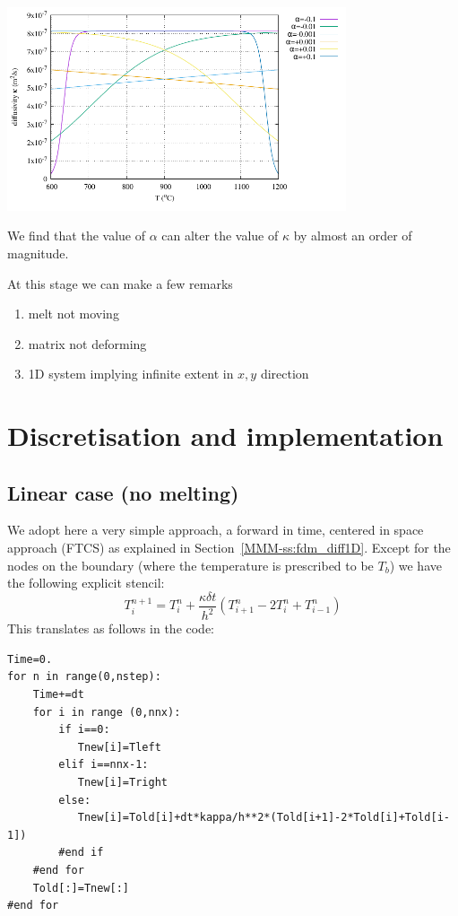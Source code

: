 \begin{center}
\includegraphics[width=10cm]{python_codes/fieldstone_169/images/kappa.pdf}
\end{center}
We find that the value of $\alpha$ can alter the value of $\kappa$ by almost an order of magnitude.

At this stage we can make a few remarks
\begin{enumerate}
\item melt not moving
\item matrix not deforming
\item 1D system implying infinite extent in $x,y$ direction
\end{enumerate}


\section*{Discretisation and implementation}

\subsection*{Linear case (no melting)}

We adopt here a very simple approach, a forward in time, 
centered in space approach (FTCS) as explained in Section~\ref{MMM-ss:fdm_diff1D}. 
Except for the nodes on the boundary (where the temperature
is prescribed to be $T_b$) we have the following explicit stencil:
\[
T_i^{n+1} 
= 
T_i^n + \frac{\kappa \delta t }{h^2} (T_{i+1}^n-2T_i^n+T_{i-1}^n)
\]
This translates as follows in the code:

\begin{lstlisting}
Time=0.
for n in range(0,nstep):
    Time+=dt
    for i in range (0,nnx):
        if i==0:
           Tnew[i]=Tleft
        elif i==nnx-1:
           Tnew[i]=Tright
        else:
           Tnew[i]=Told[i]+dt*kappa/h**2*(Told[i+1]-2*Told[i]+Told[i-1])
        #end if
    #end for
    Told[:]=Tnew[:]
#end for
\end{lstlisting}



